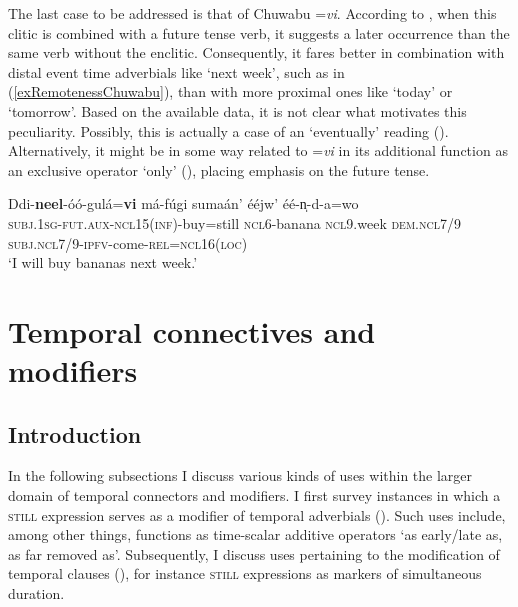  The last case to be addressed is that of Chuwabu \mbox{=\textit{vi}}. According to \textcite{Guerois2021}, when this clitic is combined with a future tense verb, it suggests a later occurrence than the same verb without the enclitic. Consequently, it fares better in combination with distal event time adverbials like \lq next week', such as in (\ref{exRemotenessChuwabu}), than with more proximal ones like \lq today' or \lq tomorrow'. Based on the available data, it is not clear what motivates this peculiarity. Possibly, this is actually a case of an \lq eventually' reading (). Alternatively, it might be in some way related to \mbox{=\textit{vi}} in its additional function as an exclusive operator \lq only\rq{ }(), placing emphasis on the future tense.

\begin{exe}
	\ex\label{exRemotenessChuwabu}
	\gll Ddi-\textbf{neel}-óó-gulá=\textbf{vi} má-fúgi sumaán' ééjw' éé-n̩-d-a=wo\\
	\textsc{subj}.1\textsc{sg}-\textsc{fut}.\textsc{aux}-\textsc{ncl}15(\textsc{inf})-buy=still \textsc{ncl}6-banana \textsc{ncl}9.week \textsc{dem}.\textsc{ncl}7/9 \textsc{subj}.\textsc{ncl}7/9-\textsc{ipfv}-come-\textsc{rel}=\textsc{ncl}16(\textsc{loc})\\
	\glt \lq I will buy bananas next week.' \parencite[191]{Guerois2021}
\end{exe}

\section{Temporal connectives and modifiers}\label{sectionConnectiveFrameSetters}
\subsection{Introduction}
In the following subsections I discuss various kinds of uses within the larger domain of temporal connectors and modifiers. I first survey instances in which a \textsc{still} expression serves as a modifier of temporal adverbials (). Such uses include, among other things, functions as time-scalar additive operators \lq as early/late as, as far removed as\rq{}. Subsequently, I discuss uses pertaining to the modification of temporal clauses (), for instance \textsc{still} expressions as markers of simultaneous duration.

